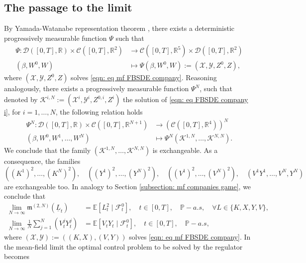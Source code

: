\documentclass[11pt,twoside]{amsart}
\theoremstyle{definition}
\numberwithin{equation}{section}
\newcommand{\E}{\mathbb{E}}
\newcommand{\R}{\mathbb{R}}
\newcommand{\ItF}{\mathcal{F}}
\newcommand{\prob}{\mathbb{P}}
\newcommand{\avg}{\frac{1}{N}\sum_{j = 1}^N}
\begin{document}
\subsection{The passage to the limit}\label{subsect_MFG_passage_to_limit}
By Yamada-Watanabe representation theorem \cite[Theorem 1.33]{carmona2018probabilistic2}, there exists a deterministic progressively measurable function $\Psi$ such that
\begin{align*}
\Psi:\mathcal{D}([0,T],\R) \times \mathcal{C}([0,T],\R^2)&\to \mathcal{C}([0,T], \R^5)\times  \mathcal{D}([0,T],\R^2) \\
(\beta, W^0, W) & \mapsto\Psi( \beta, W^0,W):= (\mathcal{X}, \mathcal{Y}, Z^0,Z),
\end{align*} 
where $(\mathcal{X},\mathcal{Y},Z^0,Z)$ solves \eqref{eqn: eq mf FBSDE company}. Reasoning analogously, there exists a progressively measurable function $\Psi^N$, such that denoted by $\mathcal{K}^{i,N}:= (\mathcal{X}^i, \mathcal{Y}^i, Z^{0,i}, Z^i)$ the solution of \eqref{eqn: eq FBSDE company i}, for $i = 1,\dots,N$, the following relation holds
\begin{align*} 
\Psi^N: \mathcal{D}([0,T],\R) \times \mathcal{C}([0,T],\R^{N+1})&\to (\mathcal{C}([0,T],\R^4))^N\\ 
 ( \beta, W^0,W^1,\dots,W^N)& \mapsto \Psi^N(\mathcal{K}^{1,N},\dots, \mathcal{K}^{N,N}).
\end{align*}
We conclude that the family $(\mathcal{K}^{1,N},\dots, \mathcal{K}^{N,N})$ is exchangeable. As a consequence, the families 
\begin{equation*}
((K^1)^2,\dots, (K^N)^2),\quad ((Y^1)^2,\dots, (Y^N)^2),\quad ((V^1)^2,\dots, (V^N)^2),\quad(V^1Y^1,\dots, V^N,Y^N)
\end{equation*}
are exchangeable too. In analogy to Section \ref{subsection: mf companies game}, we conclude that
\begin{align*} 
\lim_{N\to \infty} \mathfrak{m}^{(2,N)}(\underline{L}_t) &= \E[L_t^2 \mid \ItF^0_t],\quad t\in[0,T],\quad \prob-a.s,\quad \forall L\in \{K,X,Y,V\},\\
\lim_{N\to \infty} \avg (V^j_tY^j_t)  &= \E[V_tY_t \mid \ItF^0_t],\quad t\in[0,T],\quad \prob-a.s,
\end{align*}
where $(\mathcal{X}, \mathcal{Y}) := ((K,X), (V,Y))$ solves \eqref{eqn: eq mf FBSDE company}. In the mean-field limit the optimal control problem to be solved by the regulator becomes
\end{document}
